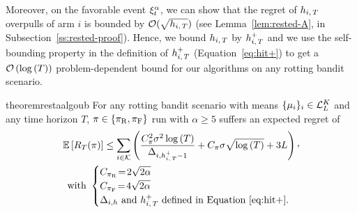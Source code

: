 Moreover,  on the favorable event $\xi^\alpha_t$, we can show that the regret of $h_{i,\,T}$ overpulls of arm $i$ is bounded by $\mathcal{O} (\sqrt{h_{i,\,T}})$ (see Lemma~\ref{lem:rested-A}, in Subsection~\ref{ss:rested-proof}). Hence, we bound $h_{i,\,T}$ by $h_{i,\,T}^+$ and we use the self-bounding property in the definition of $h_{i,\,T}^+$ (Equation~\ref{eq:hit+}) to get a $\mathcal{O}\left(\log\left(T\right)\right)$ problem-dependent bound for our algorithms on any rotting bandit scenario. 

\begin{restatable}{theorem}{restaalgoub}\label{th:rested-PD}
For any rotting bandit scenario with means $\{\mu_i\}_{i} \in \mathcal{L}_L^K$ and any time horizon $T$, $\pi \in \left\{\pi_{\rm R}, \pi_{\rm F} \right\}$ run with $\alpha \geq 5$ suffers an expected regret of
\begin{align*}
\EE{R_T(\pi)} \leq \sum_{i\in \arms} \pa{\frac{C_\pi^2\sigma^2\log\pa{T}}{\Delta_{i,\hiT^+-1}} + C_\pi \sigma \sqrt{ \log\pa{T}} +3L } \CommaBin \\
\text{with } 
\begin{cases}
C_{\piR} \!=\! 2\sqrt{2\alpha}\\
C_{\piF} \!=\! 4\sqrt{2\alpha}\\
\text{$\Delta_{i,h}$ and $\hiT^+$ defined in Equation~\ref{eq:hit+}.}
\end{cases}
\end{align*}
\end{restatable}
